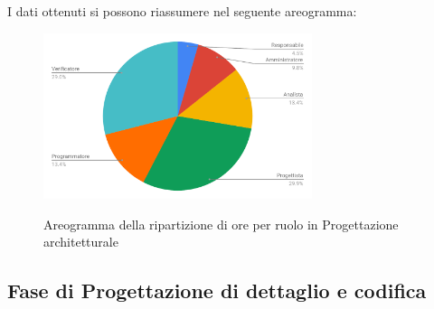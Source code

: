 \pagebreak
I dati ottenuti si possono riassumere nel seguente areogramma:
\begin{figure}[H] 
			\centering 
				\includegraphics[width=0.7\textwidth]{res/images/areogramma_architetturale.pdf}\\
				\caption{Areogramma della ripartizione di ore per ruolo in Progettazione architetturale}
			\label{AreogrammaArchitetturale}
\end{figure}

\subsection{Fase di Progettazione di dettaglio e codifica}
